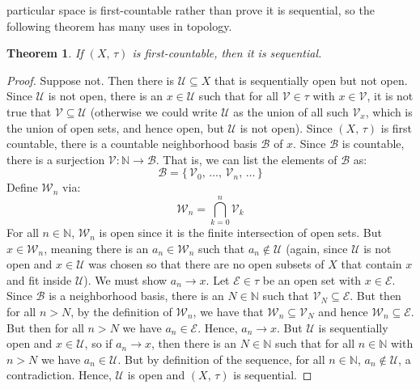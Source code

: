 \documentclass{article}
\theoremstyle{plain}
\newtheorem{theorem}{Theorem}[section]
\theoremstyle{normal}
\begin{document}
        particular space is first-countable rather than prove it is sequential,
        so the following theorem has many uses in topology.
        \begin{theorem}
            If $(X,\,\tau)$ is first-countable, then it is sequential.
        \end{theorem}
        \begin{proof}
            Suppose not. Then there is $\mathcal{U}\subseteq{X}$ that is
            sequentially open but not open. Since $\mathcal{U}$ is not open,
            there is an $x\in\mathcal{U}$ such that for all $\mathcal{V}\in\tau$
            with $x\in\mathcal{V}$, it is not true that
            $\mathcal{V}\subseteq\mathcal{U}$ (otherwise we could write
            $\mathcal{U}$ as the union of all such $\mathcal{V}_{x}$, which is
            the union of open sets, and hence open, but $\mathcal{U}$ is not
            open). Since $(X,\,\tau)$ is first countable, there is a countable
            neighborhood basis $\mathcal{B}$ of $x$. Since $\mathcal{B}$ is
            countable, there is a surjection
            $\mathcal{V}:\mathbb{N}\rightarrow\mathcal{B}$. That is, we can
            list the elements of $\mathcal{B}$ as:
            \begin{equation}
                \mathcal{B}=
                \{\,\mathcal{V}_{0},\,\dots,\,\mathcal{V}_{n},\,\dots\,\}
            \end{equation}
            Define $\mathcal{W}_{n}$ via:
            \begin{equation}
                \mathcal{W}_{n}=\bigcap_{k=0}^{n}\mathcal{V}_{k}
            \end{equation}
            For all $n\in\mathbb{N}$, $\mathcal{W}_{n}$ is open since it is
            the finite intersection of open sets. But $x\in\mathcal{W}_{n}$,
            meaning there is an $a_{n}\in\mathcal{W}_{n}$ such that
            $a_{n}\notin\mathcal{U}$ (again, since $\mathcal{U}$ is not open
            and $x\in\mathcal{U}$ was chosen so that there are no open subsets
            of $X$ that contain $x$ and fit inside $\mathcal{U}$). We must
            show $a_{n}\rightarrow{x}$. Let
            $\mathcal{E}\in\tau$ be an open set with $x\in\mathcal{E}$. Since
            $\mathcal{B}$ is a neighborhood basis, there is an
            $N\in\mathbb{N}$ such that $\mathcal{V}_{N}\subseteq\mathcal{E}$.
            But then for all $n>N$, by the definition of $\mathcal{W}_{n}$,
            we have that $\mathcal{W}_{n}\subseteq\mathcal{V}_{N}$ and hence
            $\mathcal{W}_{n}\subseteq\mathcal{E}$. But then for all $n>N$ we
            have $a_{n}\in\mathcal{E}$. Hence, $a_{n}\rightarrow{x}$. But
            $\mathcal{U}$ is sequentially open and $x\in\mathcal{U}$, so if
            $a_{n}\rightarrow{x}$, then there is an $N\in\mathbb{N}$ such that
            for all $n\in\mathbb{N}$ with $n>N$ we have $a_{n}\in\mathcal{U}$.
            But by definition of the sequence, for all $n\in\mathbb{N}$,
            $a_{n}\notin\mathcal{U}$, a contradiction. Hence,
            $\mathcal{U}$ is open and $(X,\,\tau)$ is sequential.
        \end{proof}
\end{document}
